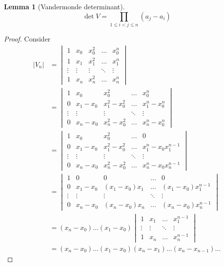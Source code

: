 \documentclass[10pt]{article}
\newcounter{thms}
\theoremstyle{definition}
\theoremstyle{definition}
\theoremstyle{plain}
\newtheorem{lemma}[thms]{Lemma}
\begin{document}
\begin{lemma}[Vandermonde determinant]
  \label{vandermonde-det}
  \[\det V = \prod_{1\leq i < j \leq n} (a_j-a_i)\]
\end{lemma}
\begin{proof}
  Consider
  \allowdisplaybreaks[2]
  \begin{align*}
    |V_n|&=
           \begin{vmatrix}
             1 & x_0 & x_0^2&\dots&x_0^n \\
             1 & x_1 & x_1^2&\dots&x_1^n \\
             \vdots &\vdots & \vdots &\ddots&\vdots \\
             1 & x_n & x_n^2&\dots&x_n^n 
           \end{vmatrix}\\
         &=
           \begin{vmatrix}
             1 & x_0 & x_0^2&\dots&x_0^n \\
             0 & x_1-x_0 & x_1^2-x_0^2&\dots&x_1^n-x_0^n \\
             \vdots &\vdots & \vdots &\ddots&\vdots \\
             0 & x_n-x_0 & x_n^2-x_0^2&\dots&x_n^n -x_0^n
           \end{vmatrix}\\
         &=
            \begin{vmatrix}
             1 & x_0 & x_0^2&\dots&0 \\
             0 & x_1-x_0 & x_1^2-x_0^2&\dots&x_1^n-x_0x_1^{n-1} \\
             \vdots &\vdots & \vdots &\ddots&\vdots \\
             0 & x_n-x_0 & x_n^2-x_0^2&\dots&x_n^n -x_0x_n^{n-1}
           \end{vmatrix}\\
          &= 
            \begin{vmatrix}
              1 & 0 & 0 &\dots&0 \\
              0 & x_1-x_0 & (x_1-x_0)x_1 & \dots & (x_1-x_0)x_1^{n-1} \\
              \vdots &\vdots & \vdots &\ddots&\vdots \\
             0 & x_n-x_0 & (x_n-x_0)x_n&\dots&(x_n-x_0)x_n^{n-1}
           \end{vmatrix}\\
         &= (x_n -x_0)\dots(x_1-x_0) 
            \begin{vmatrix}
              1 & x_1 & \dots & x_1^{n-1} \\
              \vdots &\vdots &\ddots&\vdots \\
              1 & x_n&\dots&x_n^{n-1}
           \end{vmatrix}\\
         &=(x_n-x_0)\dots (x_1-x_0)(x_n-x_1)\dots (x_n-x_{n-1})\dots
  \end{align*}
  \cite{proofwiki:vandermonde}
\end{proof}
\end{document}
